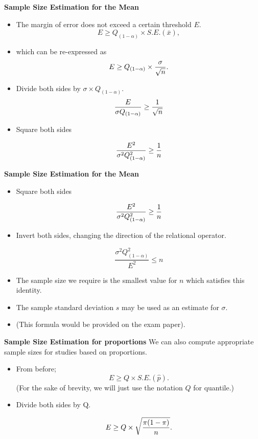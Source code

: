 
\textbf{Sample Size Estimation for the Mean}

\begin{itemize}

\item  The margin of error does not exceed a certain threshold $E$.
\[ E \geq Q_{(1-\alpha)} \times S.E.(\bar{x}), \]

\item  which can be re-expressed as
\[E \geq Q_{(1-\alpha)} \times {\sigma \over \sqrt{n} }.\]

\item  Divide both sides by $\sigma \times Q_{(1-\alpha)}$.
\[ \frac{E}{\sigma Q_{(1-\alpha)}} \geq {1 \over \sqrt{n} } \]

\item  Square both sides

\[ \frac{E^2}{\sigma^2 Q_{(1-\alpha)}^2} \geq {1 \over n } \]


\end{itemize}


\textbf{Sample Size Estimation for the Mean}

\begin{itemize}
\item  Square both sides

\[ \frac{E^2}{\sigma^2 Q^2_{(1-\alpha)}} \geq {1 \over n } \]

\item  Invert both sides, changing the direction of the relational operator.

\[ \frac{\sigma^2 Q^2_{(1-\alpha)}}{E^2} \leq n \]


\item  The sample size we require is the smallest value for $n$ which satisfies this identity.
\item  The sample standard deviation $s$ may be used as an estimate for $\sigma$.
\item  (This formula would be provided on the exam paper).
\end{itemize}








\textbf{Sample Size Estimation for proportions}
We can also compute appropriate sample sizes for studies based on proportions.
\begin{itemize}
\item  From before; \[ E \geq Q \times S.E.(\hat{p}). \]
(For the sake of brevity, we will just use the notation $Q$ for quantile.)

\item  Divide both sides by Q.

\[ E \geq Q \times \sqrt{ {\pi(1-\pi)  \over n} }. \]

\end{itemize}


